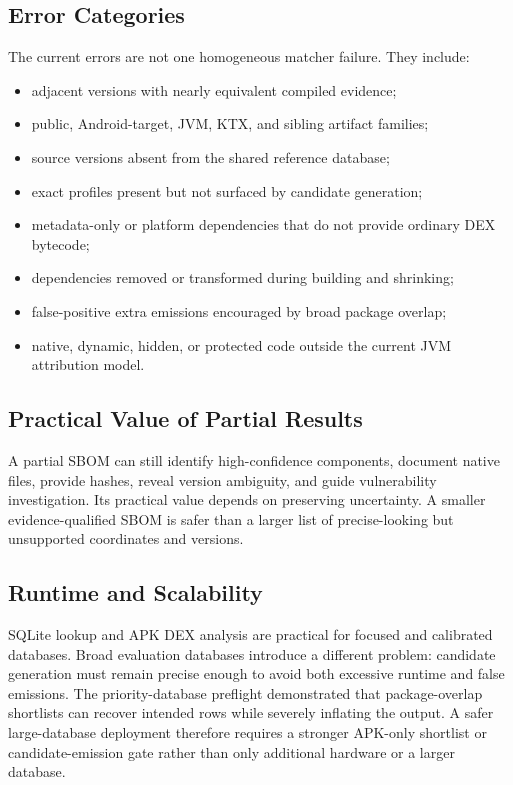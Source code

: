 \subsection{Error Categories}

The current errors are not one homogeneous matcher failure. They include:

\begin{itemize}
  \item adjacent versions with nearly equivalent compiled evidence;
  \item public, Android-target, JVM, KTX, and sibling artifact families;
  \item source versions absent from the shared reference database;
  \item exact profiles present but not surfaced by candidate generation;
  \item metadata-only or platform dependencies that do not provide ordinary
  DEX bytecode;
  \item dependencies removed or transformed during building and shrinking;
  \item false-positive extra emissions encouraged by broad package overlap;
  \item native, dynamic, hidden, or protected code outside the current JVM
  attribution model.
\end{itemize}

\subsection{Practical Value of Partial Results}

A partial SBOM can still identify high-confidence components, document native
files, provide hashes, reveal version ambiguity, and guide vulnerability
investigation. Its practical value depends on preserving uncertainty. A
smaller evidence-qualified SBOM is safer than a larger list of precise-looking
but unsupported coordinates and versions.

\subsection{Runtime and Scalability}

SQLite lookup and APK DEX analysis are practical for focused and calibrated
databases. Broad evaluation databases introduce a different problem:
candidate generation must remain precise enough to avoid both excessive
runtime and false emissions. The priority-database preflight demonstrated that
package-overlap shortlists can recover intended rows while severely inflating
the output. A safer large-database deployment therefore requires a stronger
APK-only shortlist or candidate-emission gate rather than only additional
hardware or a larger database.


